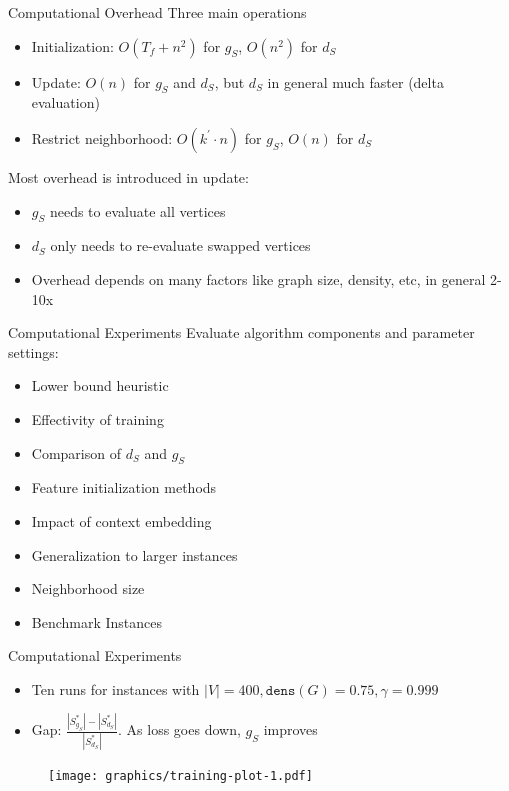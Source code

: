 \documentclass{beamer}
\begin{document}
\begin{frame}{Computational Overhead}
    Three main operations
    \begin{itemize}
        \item Initialization: $O(T_f + n^2)$ for $g_S$, $O(n^2)$ for $d_S$
        \item Update: $O(n)$ for $g_S$ and $d_S$, but $d_S$ in general much faster (delta evaluation)
        \item Restrict neighborhood: $O(k^\prime \cdot n)$ for $g_S$, $O(n)$ for $d_S$
    \end{itemize}
    Most overhead is introduced in update: 
    \begin{itemize}
        \item $g_S$ needs to evaluate all vertices
        \item $d_S$ only needs to re-evaluate swapped vertices
        \item Overhead depends on many factors like graph size, density, etc, in general 2-10x
    \end{itemize}
\end{frame}

\begin{frame}{Computational Experiments}
    Evaluate algorithm components and parameter settings:
    \begin{itemize}
        \item<1-> Lower bound heuristic
        \item<2-> Effectivity of training
        \item<3-> Comparison of $d_S$ and $g_S$
        \item<4-> Feature initialization methods
        \item<5-> Impact of context embedding
        \item<6-> Generalization to larger instances
        \item<7-> Neighborhood size
        \item<8-> Benchmark Instances
    \end{itemize} 
\end{frame}

\begin{frame}{Computational Experiments}
    \begin{itemize}
        \item Ten runs for instances with $|V| = 400, \mathtt{dens}(G) = 0.75, \gamma=0.999$
        \item Gap: $\frac{|S^*_{g_S}| - |S^*_{d_S}|}{|S^*_{d_S}|}$. As loss goes down, $g_S$ improves
    \end{itemize} 
    \begin{figure}
        \centering
        \texttt{[image: graphics/training-plot-1.pdf]}
    \end{figure}
\end{frame}
\end{document}
